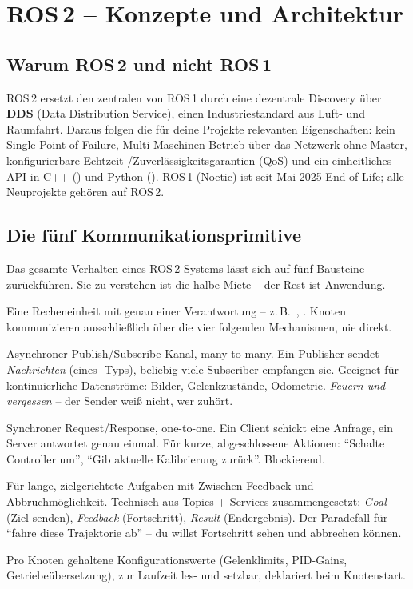 
\chapter{ROS\,2 -- Konzepte und Architektur}

\section{Warum ROS\,2 und nicht ROS\,1}
ROS\,2 ersetzt den zentralen  von ROS\,1 durch eine dezentrale
Discovery über \textbf{DDS} (Data Distribution Service), einen Industriestandard
aus Luft- und Raumfahrt. Daraus folgen die für deine Projekte relevanten
Eigenschaften: kein Single-Point-of-Failure, Multi-Maschinen-Betrieb über das
Netzwerk ohne Master, konfigurierbare Echtzeit-/Zuverlässigkeitsgarantien (QoS)
und ein einheitliches API in C++ () und Python ().
ROS\,1 (Noetic) ist seit Mai 2025 End-of-Life; alle Neuprojekte gehören auf
ROS\,2.

\section{Die fünf Kommunikationsprimitive}
Das gesamte Verhalten eines ROS\,2-Systems lässt sich auf fünf Bausteine
zurückführen. Sie zu verstehen ist die halbe Miete -- der Rest ist Anwendung.

\begin{description}[leftmargin=1.6em,style=nextline]
\item[Node (Knoten)] Eine Recheneinheit mit genau einer Verantwortung --
  z.\,B.\ , . Knoten
  kommunizieren ausschließlich über die vier folgenden Mechanismen, nie direkt.
\item[Topic (Thema)] Asynchroner Publish/Subscribe-Kanal, many-to-many. Ein
  Publisher sendet \emph{Nachrichten} (eines -Typs), beliebig viele
  Subscriber empfangen sie. Geeignet für kontinuierliche Datenströme: Bilder,
  Gelenkzustände, Odometrie. \emph{Feuern und vergessen} -- der Sender weiß
  nicht, wer zuhört.
\item[Service (Dienst)] Synchroner Request/Response, one-to-one. Ein Client
  schickt eine Anfrage, ein Server antwortet genau einmal. Für kurze,
  abgeschlossene Aktionen: ``Schalte Controller um'', ``Gib aktuelle
  Kalibrierung zurück''. Blockierend.
\item[Action (Aktion)] Für lange, zielgerichtete Aufgaben mit
  Zwischen-Feedback und Abbruchmöglichkeit. Technisch aus Topics + Services
  zusammengesetzt: \emph{Goal} (Ziel senden), \emph{Feedback} (Fortschritt),
  \emph{Result} (Endergebnis). Der Paradefall für ``fahre diese Trajektorie
  ab'' -- du willst Fortschritt sehen und abbrechen können.
\item[Parameter] Pro Knoten gehaltene Konfigurationswerte (Gelenklimits,
  PID-Gains, Getriebeübersetzung), zur Laufzeit les- und setzbar, deklariert
  beim Knotenstart.
\end{description}

